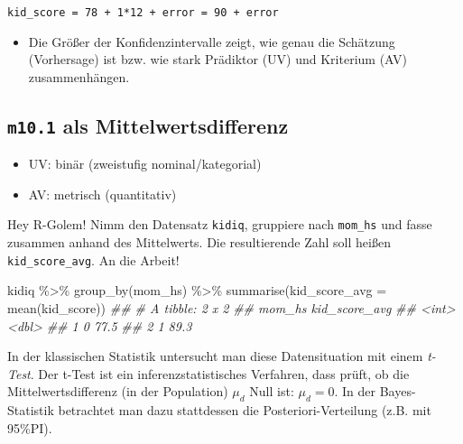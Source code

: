 \documentclass[
  a4paper,
  DIV=11]{scrreprt}
\newenvironment{Shaded}{\begin{snugshade}}{\end{snugshade}}
\newcommand{\AttributeTok}[1]{\textcolor[rgb]{0.40,0.45,0.13}{#1}}
\newcommand{\DocumentationTok}[1]{\textcolor[rgb]{0.37,0.37,0.37}{\textit{#1}}}
\newcommand{\FunctionTok}[1]{\textcolor[rgb]{0.28,0.35,0.67}{#1}}
\newcommand{\NormalTok}[1]{\textcolor[rgb]{0.00,0.23,0.31}{#1}}
\newcommand{\SpecialCharTok}[1]{\textcolor[rgb]{0.37,0.37,0.37}{#1}}
\providecommand{\tightlist}{%
  \setlength{\itemsep}{0pt}\setlength{\parskip}{0pt}}\usepackage{longtable,booktabs,array}
\theoremstyle{definition}
\theoremstyle{remark}
\begin{document}
\texttt{kid\_score\ =\ 78\ +\ 1*12\ +\ error\ =\ 90\ +\ error}

\begin{itemize}
\tightlist
\item
  Die Größer der Konfidenzintervalle zeigt, wie genau die Schätzung
  (Vorhersage) ist bzw. wie stark Prädiktor (UV) und Kriterium (AV)
  zusammenhängen.
\end{itemize}

\hypertarget{m10.1-als-mittelwertsdifferenz}{%
\subsection{\texorpdfstring{\texttt{m10.1} als
Mittelwertsdifferenz}{m10.1 als Mittelwertsdifferenz}}\label{m10.1-als-mittelwertsdifferenz}}

\begin{itemize}
\tightlist
\item
  UV: binär (zweistufig nominal/kategorial)
\item
  AV: metrisch (quantitativ)
\end{itemize}

Hey R-Golem! Nimm den Datensatz \texttt{kidiq}, gruppiere nach
\texttt{mom\_hs} und fasse zusammen anhand des Mittelwerts. Die
resultierende Zahl soll heißen \texttt{kid\_score\_avg}. An die Arbeit!

\begin{Shaded}
\begin{Highlighting}[]
\NormalTok{kidiq }\SpecialCharTok{\%\textgreater{}\%} 
  \FunctionTok{group\_by}\NormalTok{(mom\_hs) }\SpecialCharTok{\%\textgreater{}\%} 
  \FunctionTok{summarise}\NormalTok{(}\AttributeTok{kid\_score\_avg =} 
              \FunctionTok{mean}\NormalTok{(kid\_score))}
\DocumentationTok{\#\# \# A tibble: 2 x 2}
\DocumentationTok{\#\#   mom\_hs kid\_score\_avg}
\DocumentationTok{\#\#    \textless{}int\textgreater{}         \textless{}dbl\textgreater{}}
\DocumentationTok{\#\# 1      0          77.5}
\DocumentationTok{\#\# 2      1          89.3}
\end{Highlighting}
\end{Shaded}

In der klassischen Statistik untersucht man diese Datensituation mit
einem \emph{t-Test}. Der t-Test ist ein inferenzstatistisches Verfahren,
dass prüft, ob die Mittelwertsdifferenz (in der Population) \(\mu_d\)
Null ist: \(\mu_d = 0\). In der Bayes-Statistik betrachtet man dazu
stattdessen die Posteriori-Verteilung (z.B. mit 95\%PI).
\end{document}

